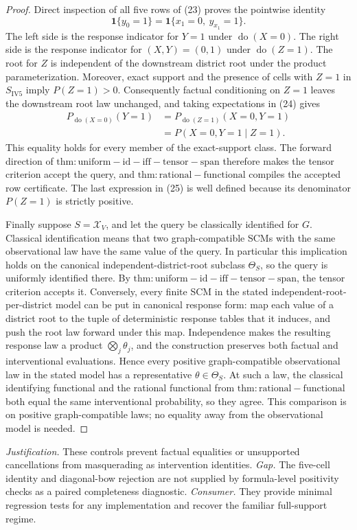 \documentclass{article}
\begin{document}
\begin{proof}
Direct inspection of all five rows of (23) proves the pointwise identity
\[
\mathbf 1\{y_0=1\}
=\mathbf 1\{x_1=0,\ y_{x_1}=1\}.                            \tag{24}
\]
The left side is the response indicator for \(Y=1\) under \(\operatorname{do}(X=0)\).  The right side is the response indicator for \((X,Y)=(0,1)\) under \(\operatorname{do}(Z=1)\).  The root for \(Z\) is independent of the downstream district root under the product parameterization.  Moreover, exact support and the presence of cells with \(Z=1\) in \(S_{\mathrm{IV5}}\) imply \(P(Z=1)>0\).  Consequently factual conditioning on \(Z=1\) leaves the downstream root law unchanged, and taking expectations in (24) gives
\[
\begin{aligned}
P_{\operatorname{do}(X=0)}(Y=1)
&=P_{\operatorname{do}(Z=1)}(X=0,Y=1)\\
&=P(X=0,Y=1\mid Z=1).                                        \tag{25}
\end{aligned}
\]
This equality holds for every member of the exact-support class.  The forward direction of \(\mathrm{thm:uniform-id-iff-tensor-span}\) therefore makes the tensor criterion accept the query, and \(\mathrm{thm:rational-functional}\) compiles the accepted row certificate.  The last expression in (25) is well defined because its denominator \(P(Z=1)\) is strictly positive.

Finally suppose \(S=\mathcal X_V\), and let the query be classically identified for \(G\).  Classical identification means that two graph-compatible SCMs with the same observational law have the same value of the query.  In particular this implication holds on the canonical independent-district-root subclass \(\Theta_S\), so the query is uniformly identified there.  By \(\mathrm{thm:uniform-id-iff-tensor-span}\), the tensor criterion accepts it.  Conversely, every finite SCM in the stated independent-root-per-district model can be put in canonical response form: map each value of a district root to the tuple of deterministic response tables that it induces, and push the root law forward under this map.  Independence makes the resulting response law a product \(\bigotimes_j\theta_j\), and the construction preserves both factual and interventional evaluations.  Hence every positive graph-compatible observational law in the stated model has a representative \(\theta\in\Theta_S\).  At such a law, the classical identifying functional and the rational functional from \(\mathrm{thm:rational-functional}\) both equal the same interventional probability, so they agree.  This comparison is on positive graph-compatible laws; no equality away from the observational model is needed.
\end{proof}
\par\smallskip\noindent \textit{Justification.} These controls prevent factual equalities or unsupported cancellations from masquerading as intervention identities. \textit{Gap.} The five-cell identity and diagonal-bow rejection are not supplied by formula-level positivity checks as a paired completeness diagnostic. \textit{Consumer.} They provide minimal regression tests for any implementation and recover the familiar full-support regime.
\end{document}
